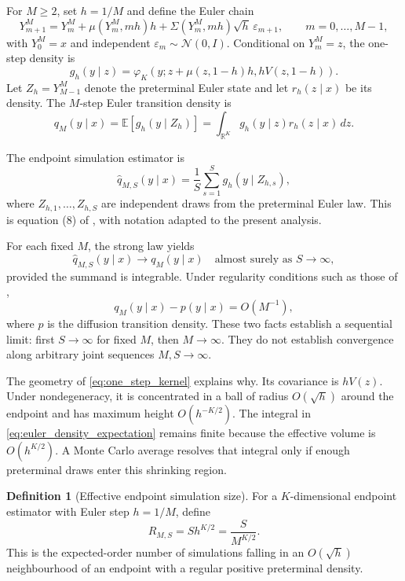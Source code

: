 \documentclass[11pt]{article}
\theoremstyle{definition}
\newtheorem{definition}[definition]{Definition}
\newcommand{\R}{\mathbb{R}}
\newcommand{\E}{\mathbb{E}}
\newcommand{\Normal}{\mathcal{N}}
\newcommand{\phik}{\varphi_K}
\begin{document}
For $M\ge2$, set $h=1/M$ and define the Euler chain \citep{KloedenPlaten1992}
\begin{equation}\label{eq:euler}
Y^M_{m+1}=Y^M_m+\mu(Y^M_m,mh)h
 +\Sigma(Y^M_m,mh)\sqrt{h}\,\varepsilon_{m+1},
\qquad m=0,\ldots,M-1,
\end{equation}
with $Y^M_0=x$ and independent $\varepsilon_m\sim\Normal(0,I)$. Conditional on $Y^M_m=z$, the one-step density is
\begin{equation}\label{eq:one_step_kernel}
g_h(y\mid z)
=
\phik\!\left(y;
 z+\mu(z,1-h)h,
 hV(z,1-h)
\right).
\end{equation}
Let $Z_h=Y^M_{M-1}$ denote the preterminal Euler state and let $r_h(z\mid x)$ be its density. The $M$-step Euler transition density is
\begin{equation}\label{eq:euler_density_expectation}
q_M(y\mid x)=\E[g_h(y\mid Z_h)]
=\int_{\R^K}g_h(y\mid z)r_h(z\mid x)\,dz.
\end{equation}

The endpoint simulation estimator is
\begin{equation}\label{eq:pedersen_estimator}
\widehat q_{M,S}(y\mid x)
=
\frac{1}{S}\sum_{s=1}^S g_h(y\mid Z_{h,s}),
\end{equation}
where $Z_{h,1},\ldots,Z_{h,S}$ are independent draws from the preterminal Euler law. This is equation (8) of \citet{BrandtSantaClara2002}, with notation adapted to the present analysis.

For each fixed $M$, the strong law yields
\[
\widehat q_{M,S}(y\mid x)\longrightarrow q_M(y\mid x)
\quad\text{almost surely as }S\to\infty,
\]
provided the summand is integrable. Under regularity conditions such as those of \citet{BallyTalay1996a,BallyTalay1996b},
\[
q_M(y\mid x)-p(y\mid x)=O(M^{-1}),
\]
where $p$ is the diffusion transition density. These two facts establish a sequential limit: first $S\to\infty$ for fixed $M$, then $M\to\infty$. They do not establish convergence along arbitrary joint sequences $M,S\to\infty$.

The geometry of \eqref{eq:one_step_kernel} explains why. Its covariance is $hV(z)$. Under nondegeneracy, it is concentrated in a ball of radius $O(\sqrt h)$ around the endpoint and has maximum height $O(h^{-K/2})$. The integral in \eqref{eq:euler_density_expectation} remains finite because the effective volume is $O(h^{K/2})$. A Monte Carlo average resolves that integral only if enough preterminal draws enter this shrinking region.

\begin{definition}[Effective endpoint simulation size]\label{def:effective_size}
For a $K$-dimensional endpoint estimator with Euler step $h=1/M$, define
\begin{equation}\label{eq:effective_size}
R_{M,S}=S h^{K/2}=\frac{S}{M^{K/2}}.
\end{equation}
This is the expected-order number of simulations falling in an $O(\sqrt h)$ neighbourhood of an endpoint with a regular positive preterminal density.
\end{definition}
\end{document}
